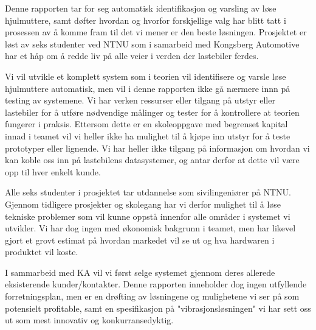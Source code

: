 
Denne rapporten tar for seg automatisk identifikasjon og varsling av løse hjulmuttere, samt døfter hvordan og hvorfor forskjellige
valg har blitt tatt i prosessen av å komme fram til det vi mener er den beste løsningen. Prosjektet er løst av seks studenter ved NTNU
som i samarbeid med Kongsberg Automotive har et håp om å redde liv på alle veier i verden der lastebiler ferdes. 

Vi vil utvikle et komplett system som i teorien vil identifisere og varsle løse hjulmuttere automatisk, men vil i denne rapporten ikke 
gå nærmere innn på testing av systemene. Vi har verken ressurser eller tilgang på utstyr eller lastebiler for å utføre 
nødvendige målinger og tester for å kontrollere at teorien fungerer i praksis. Ettersom dette er en skoleoppgave med begrenset
kapital innad i teamet vil vi heller ikke ha mulighet til å kjøpe inn utstyr for å teste prototyper eller lignende. Vi har heller ikke 
tilgang på informasjon om hvordan vi kan koble oss inn på lastebilens datasystemer, og antar derfor at dette vil være opp til hver
enkelt kunde.

Alle seks studenter i prosjektet tar utdannelse som sivilingeniører på NTNU. Gjennom tidligere prosjekter og skolegang har vi derfor
mulighet til å løse tekniske problemer som vil kunne oppstå innenfor alle områder i systemet vi utvikler. Vi har dog ingen med
økonomisk bakgrunn i teamet, men har likevel gjort et grovt estimat på hvordan markedet vil se ut og hva hardwaren i produktet
vil koste.

I sammarbeid med KA vil vi først selge systemet gjennom deres allerede eksisterende kunder/kontakter. Denne rapporten
inneholder dog ingen utfyllende forretningsplan, men er en drøfting av løsningene og mulighetene vi ser på
som potensielt profitable, samt en spesifikasjon på "vibrasjonsløsningen" vi har sett oss ut som mest innovativ og konkurransedyktig.